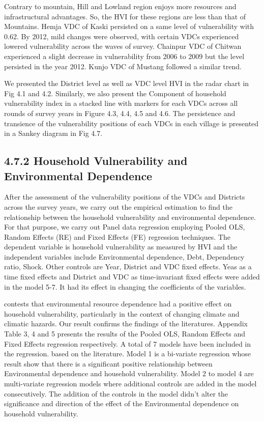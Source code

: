 Contrary to mountain, Hill and Lowland region enjoys more resources and infrastructural advantages. So, the HVI for these regions are less than that of Mountains.  Hemja VDC of Kaski persisted on a same level of vulnerability with 0.62. By 2012, mild changes were observed, with certain VDCs experienced lowered vulnerability across the waves of survey. Chainpur VDC of Chitwan experienced a slight decrease in vulnerability from 2006 to 2009 but the level persisted in the year 2012. Kunjo VDC of Mustang followed a similar trend.  

We presented the District level as well as VDC level HVI in the radar chart in Fig 4.1 and 4.2. Similarly, we also present the Component of household vulnerability index in a stacked line with markers for each VDCs across all rounds of survey years in Figure 4.3, 4.4, 4.5 and 4.6. The persistence and transience of the vulnerability positions of each VDCs in each village is presented in a Sankey diagram in Fig 4.7.


\subsection*{4.7.2 Household Vulnerability and Environmental Dependence}  
After the assessment of the vulnerability positions of the VDCs and Districts across the survey years, we carry out the empirical estimation to find the relationship between the household vulnerability and environmental dependence. For that purpose, we carry out Panel data regression employing Pooled OLS, Random Effects (RE) and Fixed Effects (FE) regression techniques. The dependent variable is household vulnerability as measured by HVI and the independent variables include Environmental dependence, Debt, Dependency ratio, Shock. Other controls are Year, District and VDC fixed effects. Yeas as a time fixed effects and District and VDC as time-invariant fixed effects were added in the model 5-7. It had its effect in changing the coefficients of the variables. 

\cite{angelsen2015environmental, abbas2018sustainable, gentle2014differential} contests that environmental resource dependence had a positive effect on household vulnerability, particularly in the context of changing climate and climatic hazards. Our result confirms the findings of the literatures. Appendix Table 3, 4 and 5 presents the results of the Pooled OLS, Random Effects and Fixed Effects regression respectively. A total of 7 models have been included in the regression. based on the literature. Model 1 is a bi-variate regression whose result show that there is a significant positive relationship between Environmental dependence and household vulnerability. Model 2 to model 4 are multi-variate regression models where additional controls are added in the model consecutively. The addition of the controls in the model didn't alter the significance and direction of the effect of the Environmental dependence on household vulnerability. 

